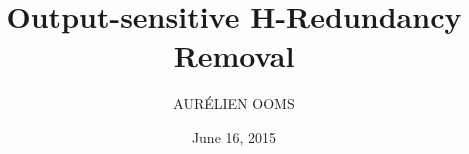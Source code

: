 \title[]{\textbf{Output-sensitive H-Redundancy Removal\vspace{3mm}}}
\author[]{\large AURÉLIEN OOMS\vspace{5mm}}
\date{June 16, 2015}

\begin{frame}
\titlepage{}
\end{frame}
